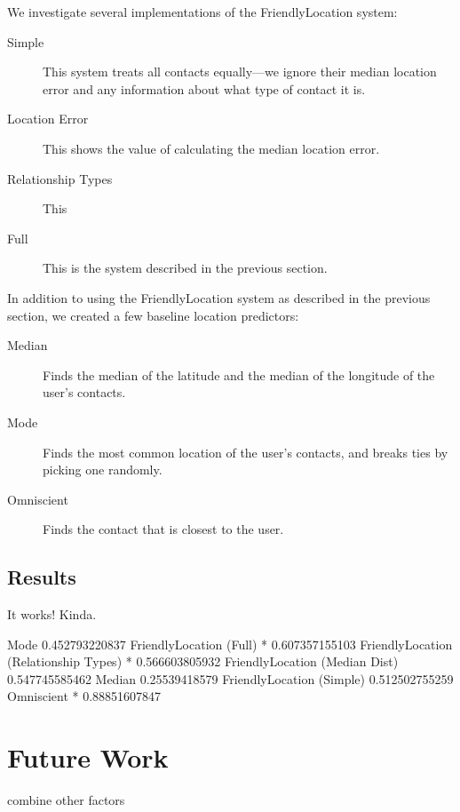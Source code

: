 \documentclass{sig-alternate}
\begin{document}
We investigate several implementations of the FriendlyLocation system:
\begin{description}
\item[Simple] This system treats all contacts equally---we ignore their median location error and any information about what type of contact it is.
\item[Location Error] This shows the value of calculating the median location error.
\item[Relationship Types] This 
\item[Full] This is the system described in the previous section.
\end{description}

In addition to using the FriendlyLocation system as described in the previous section, we created a few baseline location predictors:
\begin{description}
\item[Median] Finds the median of the latitude and the median of the longitude of the user's contacts.
\item[Mode] Finds the most common location of the user's contacts, and breaks ties by picking one randomly.
\item[Omniscient] Finds the contact that is closest to the user.
\end{description}

\subsection{Results}
\begin{figure}
\centering
{}
\caption{
}
\label{fig:FinalResults}
\end{figure}

It works! Kinda.

Mode 0.452793220837
FriendlyLocation (Full) * 0.607357155103
FriendlyLocation (Relationship Types) * 0.566603805932
FriendlyLocation (Median Dist) 0.547745585462
Median 0.25539418579
FriendlyLocation (Simple) 0.512502755259
Omniscient * 0.88851607847


\section{Future Work}
combine other factors


 
\end{document}
